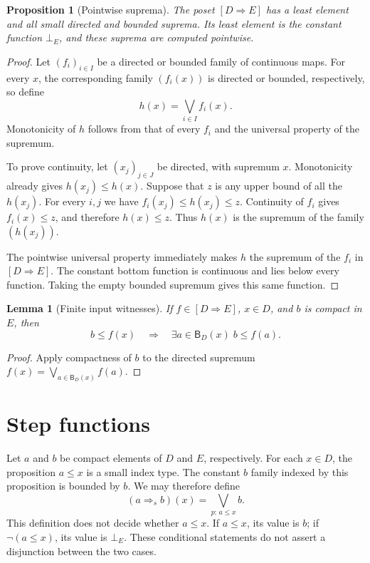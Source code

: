 \documentclass[11pt,a4paper]{article}
\newtheorem{lemma}[theorem]{Lemma}
\newtheorem{proposition}[theorem]{Proposition}
\theoremstyle{definition}
\theoremstyle{remark}
\newcommand{\B}{\mathsf B}
\newcommand{\Cont}[2]{[#1\mathbin{\Rightarrow}#2]}
\newcommand{\step}[2]{(#1\mathbin{\Rightarrow}_{\!s}#2)}
\newcommand{\lub}{\bigvee}
\begin{document}
\begin{proposition}[Pointwise suprema]\label{prop:pointwise}
The poset $\Cont D E$ has a least element and all small directed and
bounded suprema. Its least element is the constant function $\bot_E$,
and these suprema are computed pointwise.
\end{proposition}
\begin{proof}
Let $(f_i)_{i\in I}$ be a directed or bounded family of continuous maps.
For every $x$, the corresponding family $(f_i(x))$ is directed or bounded,
respectively, so define
\[
 h(x)=\lub_{i\in I}f_i(x).
\]
Monotonicity of $h$ follows from that of every $f_i$ and the universal
property of the supremum.

To prove continuity, let $(x_j)_{j\in J}$ be directed, with supremum $x$.
Monotonicity already gives $h(x_j)\leq h(x)$. Suppose that $z$ is any upper
bound of all the $h(x_j)$. For every $i,j$ we have
$f_i(x_j)\leq h(x_j)\leq z$. Continuity of $f_i$ gives $f_i(x)\leq z$,
and therefore $h(x)\leq z$. Thus $h(x)$ is the supremum of the family
$(h(x_j))$.

The pointwise universal property immediately makes $h$ the supremum of
the $f_i$ in $\Cont D E$. The constant bottom function is continuous
and lies below every function. Taking the empty bounded supremum gives
this same function.
\end{proof}

\begin{lemma}[Finite input witnesses]\label{lem:witness}
If $f\in\Cont D E$, $x\in D$, and $b$ is compact in $E$, then
\[
 b\leq f(x)
 \quad\Longrightarrow\quad
 \exists a\in\B_D(x)\; b\leq f(a).
\]
\end{lemma}
\begin{proof}
Apply compactness of $b$ to the directed supremum
$f(x)=\lub_{a\in\B_D(x)}f(a)$.
\end{proof}

\section{Step functions}

Let $a$ and $b$ be compact elements of $D$ and $E$, respectively.
For each $x\in D$, the proposition $a\leq x$ is a small index type.
The constant $b$ family indexed by this proposition is bounded by $b$.
We may therefore define
\begin{equation}\label{eq:step}
 \step a b(x)=\lub_{p:\,a\leq x} b.
\end{equation}
This definition does not decide whether $a\leq x$. If $a\leq x$, its
value is $b$; if $\neg(a\leq x)$, its value is $\bot_E$. These conditional
statements do not assert a disjunction between the two cases.
\end{document}
